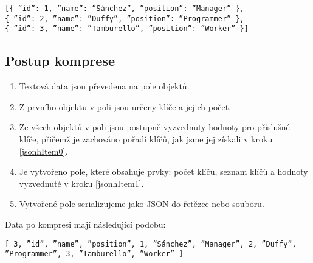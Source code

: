 \texttt{[\{ \textquotedblright id\textquotedblright : 1, \textquotedblright name\textquotedblright : \textquotedblright Sánchez\textquotedblright, \textquotedblright position\textquotedblright : \textquotedblright Manager\textquotedblright\ \},\\
\hspace*{2.3mm}\{ \textquotedblright id\textquotedblright : 2, \textquotedblright name\textquotedblright : \textquotedblright Duffy\textquotedblright, \textquotedblright position\textquotedblright : \textquotedblright Programmer\textquotedblright\ \},\\
\hspace*{2.3mm}\{ \textquotedblright id\textquotedblright : 3, \textquotedblright name\textquotedblright : \textquotedblright Tamburello\textquotedblright, \textquotedblright position\textquotedblright : \textquotedblright Worker\textquotedblright\ \}]}

\subsection{Postup komprese}
\begin{enumerate}
\item Textová data jsou převedena na pole objektů.
\item \label{jsonhItem0} Z prvního objektu v poli jsou určeny klíče a jejich počet.
\item \label{jsonhItem1} Ze všech objektů v poli jsou postupně vyzvednuty hodnoty pro příslušné klíče, přičemž je zachováno pořadí klíčů, jak jsme jej získali v kroku \ref{jsonhItem0}.
\item Je vytvořeno pole, které obsahuje prvky: počet klíčů, seznam klíčů a hodnoty vyzvednuté v kroku \ref{jsonhItem1}.
\item Vytvořené pole serializujeme jako JSON do řetězce nebo souboru.
\end{enumerate}

Data po kompresi mají následující podobu:

\texttt{[ 3, \textquotedblright id\textquotedblright, \textquotedblright name\textquotedblright, \textquotedblright position\textquotedblright, 1, \textquotedblright Sánchez\textquotedblright, \textquotedblright Manager\textquotedblright, 2, \textquotedblright Duffy\textquotedblright,\\
\hspace*{5mm}\textquotedblright Programmer\textquotedblright, 3, \textquotedblright Tamburello\textquotedblright, \textquotedblright Worker\textquotedblright\ ]}


